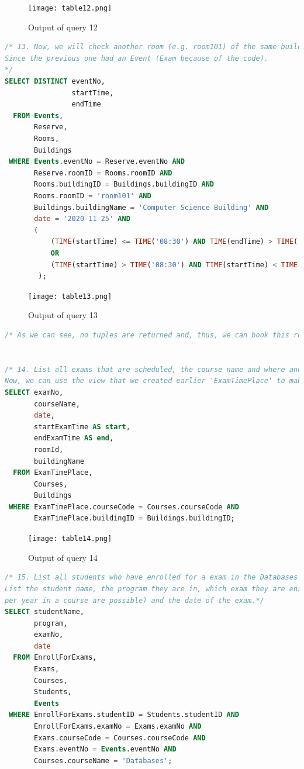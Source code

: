 \documentclass{article}
\begin{document}
\begin{figure}[!h]
	\centering
	\texttt{[image: table12.png]}
	\caption{Output of query 12}
	\label{fig:12}
\end{figure}

\begin{lstlisting}[language=SQL]
/* 13. Now, we will check another room (e.g. room101) of the same building for the same time schedule.
Since the previous one had an Event (Exam because of the code).
*/
SELECT DISTINCT eventNo,
                startTime,
                endTime
  FROM Events,
       Reserve,
       Rooms,
       Buildings
 WHERE Events.eventNo = Reserve.eventNo AND 
       Reserve.roomID = Rooms.roomID AND
       Rooms.buildingID = Buildings.buildingID AND 
       Rooms.roomID = 'room101' AND 
       Buildings.buildingName = 'Computer Science Building' AND 
       date = '2020-11-25' AND 
       (
           (TIME(startTime) <= TIME('08:30') AND TIME(endTime) > TIME('08:30') ) 
           OR 
           (TIME(startTime) > TIME('08:30') AND TIME(startTime) < TIME('10:30') )
        );
\end{lstlisting}

\begin{figure}[!h]
	\centering
	\texttt{[image: table13.png]}
	\caption{Output of query 13}
	\label{fig:13}
\end{figure}

\begin{lstlisting}[language=SQL]
/* As we can see, no tuples are returned and, thus, we can book this room for this time schedule freely.*/


/* 14. List all exams that are scheduled, the course name and where and when it is scheduled to take place.
Now, we can use the view that we created earlier 'ExamTimePlace' to make the query much simpler.*/ 
SELECT examNo,
       courseName,
       date,
       startExamTime AS start,
       endExamTime AS end,
       roomId,
       buildingName
  FROM ExamTimePlace,
       Courses,
       Buildings
 WHERE ExamTimePlace.courseCode = Courses.courseCode AND 
       ExamTimePlace.buildingID = Buildings.buildingID;
\end{lstlisting}

\begin{figure}[!h]
	\centering
	\texttt{[image: table14.png]}
	\caption{Output of query 14}
	\label{fig:14}
\end{figure}

\begin{lstlisting}[language=SQL]
/* 15. List all students who have enrolled for a exam in the Databases course.
List the student name, the program they are in, which exam they are enrolled in (multiple exams
per year in a course are possible) and the date of the exam.*/
SELECT studentName,
       program,
       examNo,
       date
  FROM EnrollForExams,
       Exams,
       Courses,
       Students,
       Events
 WHERE EnrollForExams.studentID = Students.studentID AND 
       EnrollForExams.examNo = Exams.examNo AND 
       Exams.courseCode = Courses.courseCode AND 
       Exams.eventNo = Events.eventNo AND
       Courses.courseName = 'Databases';
\end{lstlisting}
\end{document}
